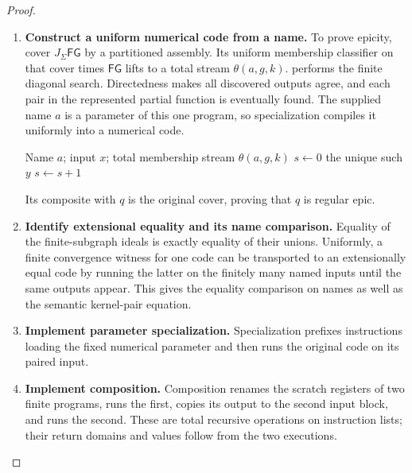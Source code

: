 \documentclass[11pt,a4paper]{article}
\numberwithin{algorithm}{section}
\numberwithin{equation}{section}
\theoremstyle{definition}
\theoremstyle{remark}
\theoremstyle{plain}
\newcommand{\J}{J_{\Sigma}}
\theoremstyle{definition}
\theoremstyle{plain}
\begin{document}
\begin{proof}
\begin{enumerate}[leftmargin=*,align=left]
\item \textbf{Construct a uniform numerical code from a name.}
To prove epicity, cover $\J\mathsf{FG}$ by a partitioned assembly.
Its uniform membership classifier on that cover times $\mathsf{FG}$
lifts to a total stream $\theta(a,g,k)$.
 performs the finite diagonal search.
Directedness makes all discovered outputs agree, and each pair in
the represented partial function is eventually found. The supplied
name $a$ is a parameter of this one program, so specialization
compiles it uniformly into a numerical code.
\begin{algorithm}[H]
\caption{Evaluation from a named finite-graph ideal}\label{alg:graph-name-search}
\small
\begin{algorithmic}[1]
\Require Name $a$; input $x$; total membership stream $\theta(a,g,k)$
\State $s\gets0$
        \State \Return the unique such $y$
      \EndIf
    \EndFor
  \EndFor
  \State $s\gets s+1$
\EndWhile
\end{algorithmic}
\end{algorithm}
Its composite with $q$ is the original cover, proving that $q$
is regular epic.

\item \textbf{Identify extensional equality and its name comparison.}
Equality of the finite-subgraph ideals is exactly equality of
their unions. Uniformly, a finite convergence witness for one
code can be transported to an extensionally equal code by
running the latter on the finitely many named inputs until
the same outputs appear. This gives the equality comparison
on names as well as the semantic kernel-pair equation.

\item \textbf{Implement parameter specialization.}
Specialization prefixes instructions loading the fixed numerical
parameter and then runs the original code on its paired input.

\item \textbf{Implement composition.}
Composition renames the scratch registers of two finite programs,
runs the first, copies its output to the second input block,
and runs the second. These are total recursive operations on
instruction lists; their return domains and values follow from
the two executions.
\end{enumerate}
\end{proof}
\end{document}
